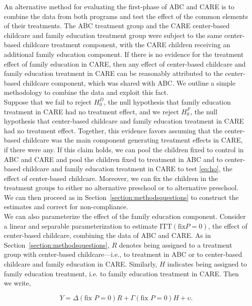 \noindent An alternative method for evaluating the first-phase of ABC and CARE is to combine the data from both programs and test the effect of the common elements of their treatments. The ABC treatment group and the CARE center-based childcare and family education treatment group were subject to the same center-based childcare treatment component, with the CARE children receiving an additional family education component. If there is no evidence for the treatment effect of family education in CARE, then any effect of center-based childcare and family education treatment in CARE can be reasonably attributed to the center-based childcare component, which was shared with ABC. We outline a simple methodology to combine the data and exploit this fact.\\

\noindent Suppose that we fail to reject $H_{0}^D$, the null hypothesis that family education treatment in CARE had no treatment effect, and we reject $H_{0}^F$, the null hypothesis that center-based childcare and family education treatment in CARE had no treatment effect. Together, this evidence favors assuming that the center-based childcare was the main component generating treatment effects in CARE, if there were any. If this claim holds, we can pool the children fixed to control in ABC and CARE and pool the children fixed to treatment in ABC and to center-based childcare and family education treatment in CARE to test \eqref{eq:ho}, the effect of center-based childcare. Moreover, we can fix the children in the treatment groups to either no alternative preschool or to alternative preschool. We can then proceed as in Section~\ref{section:methodsquestions} to construct the estimates and correct for non-compliance.\\

\noindent We can also parameterize the effect of the family education component. Consider a linear and separable parameterization to estimate $\text{ITT} \left( \text{fix} P = 0\right)$, the effect of center-based childcare, combining the data of ABC and CARE. As in Section~\ref{section:methodsquestions}, $R$ denotes being assigned to a treatment group with center-based childcare---i.e., to treatment in ABC or to center-based childcare and family education in CARE. Similarly, $H$ indicates being assigned to family education treatment, i.e. to family education treatment in CARE. Then we write, 

\begin{equation}
Y = \Delta \left( \text{fix } P = 0\right) R +  \Gamma \left( \text{fix } P = 0\right) H + \upsilon. \label{eq:fixfam}
\end{equation}

